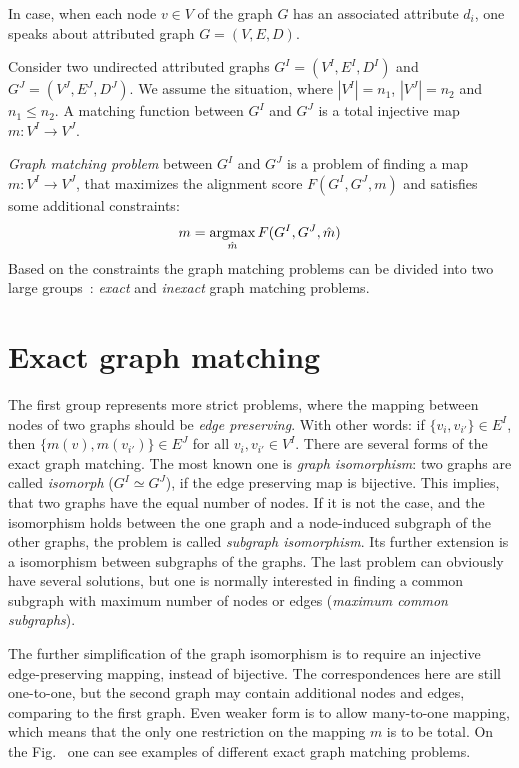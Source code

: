 In case, when each node $v\in V$ of the graph $G$ has an associated attribute $d_i$, one speaks about attributed graph $G=(V,E,D)$.

Consider two undirected attributed graphs $G^I = (V^I, E^I, D^I)$ and $G^J = (V^J, E^J, D^J)$. We assume the situation, where $|V^I|=n_1$, $|V^J|=n_2$ and $n_1\le n_2$. A matching function between $G^I$ and $G^J$ is a total injective map $m:V^I\rightarrow V^J$.

\emph{Graph matching problem} between $G^I$ and $G^J$ is a problem of finding a map $m:V^I\rightarrow V^J$, that maximizes the alignment score $F(G^I, G^J, m)$ and satisfies some additional constraints:
\begin{equation} \label{gGMP}
m = \mathop{\rm argmax}_{\hat{m}}F(G^I, G^J, \hat{m})
\end{equation}
Based on the constraints the graph matching problems can be divided into two large groups~\cite{Conte2004}: \emph{exact} and \emph{inexact} graph matching problems.
 
\section{Exact graph matching}
The first group represents more strict problems, where the mapping between nodes of two graphs should be \emph{edge preserving}. With other words: if $\{v_i,v_{i'}\}\in E^I$, then $\{m(v),m(v_{i'})\}\in E^J$ for all $v_i,v_{i'}\in V^I$. There are several forms of the exact graph matching. The most known one is \emph{graph isomorphism}: two graphs are called \emph{isomorph} ($G^I\simeq G^J$), if the edge preserving map is bijective. This implies, that two graphs have the equal number of nodes. If it is not the case, and the isomorphism holds between the one graph and a node-induced subgraph of the other graphs, the problem is called \emph{subgraph isomorphism}. Its further extension is a isomorphism between subgraphs of the graphs. The last problem can obviously have several solutions, but one is normally interested in finding a common subgraph with maximum number of nodes or edges (\emph{maximum common subgraphs}).  

The further simplification of the graph isomorphism is to require an injective edge-preserving mapping, instead of bijective. The correspondences here are still one-to-one, but the second graph may contain additional nodes and edges, comparing to the first graph.
Even weaker form is to allow many-to-one mapping, which means that the only one restriction on the mapping $m$ is to be total.
On the Fig.~ one can see examples of different exact graph matching problems.

